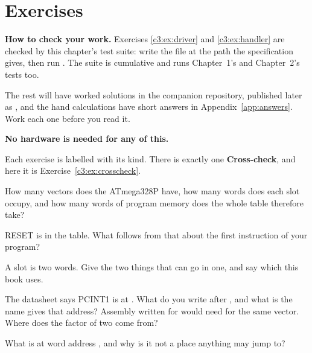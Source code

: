 
\section{Exercises}
\label{c3:sec:exercises}

\begin{aside}
\textbf{How to check your work.} Exercises \ref{c3:ex:driver} and \ref{c3:ex:handler} are checked
by this chapter's test suite: write the file at the path the specification gives, then run
. The suite is cumulative and runs Chapter~1's and Chapter~2's tests too.

The rest will have worked solutions in the companion repository, published later as
, and the hand calculations have short answers in
Appendix~\ref{app:answers}. Work each one before you read it.

\textbf{No hardware is needed for any of this.}
\end{aside}

Each exercise is labelled with its kind. There is exactly one \textbf{Cross-check}, and here it is
Exercise~\ref{c3:ex:crosscheck}.

\label{c3:ex:table}
\begin{parts}
  \item How many vectors does the ATmega328P have, how many words does each slot occupy, and how
    many words of program memory does the whole table therefore take?
  \item RESET is in the table. What follows from that about the first instruction of your
    program?
  \item A slot is two words. Give the two things that can go in one, and say which this book uses.
  \item The datasheet says PCINT1 is at . What do you write after , and
    what is the name  gives that address? Assembly written for 
    would need  for the same vector. Where does the factor of two come from?
  \item What is at word address , and why is it not a place anything may jump to?
\end{parts}

